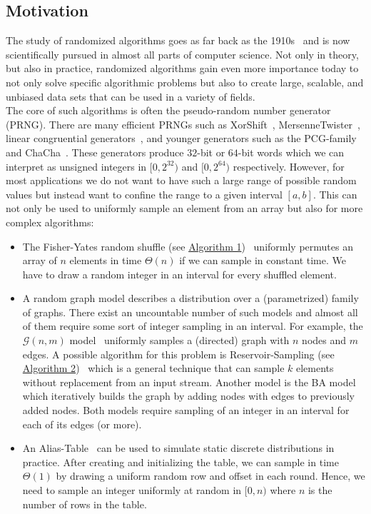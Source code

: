 \documentclass[a4paper, UKenglish, cleveref, autoref, thm-restate]{lipics-v2021}
\begin{document}
\subsection{Motivation}
The study of randomized algorithms goes as far back as the 1910s~\cite{MathComp} and is now scientifically pursued in almost all parts of computer science.
Not only in theory, but also in practice, randomized algorithms gain even more importance today to not only solve specific algorithmic problems but also to create large, scalable, and unbiased data sets that can be used in a variety of fields.
\\
The core of such algorithms is often the pseudo-random number generator (PRNG).
There are many efficient PRNGs such as XorShift~\cite{XS}, MersenneTwister~\cite{MT}, linear congruential generators~\cite{LinConGen, MINSTD, LM}, and younger generators such as the PCG-family~\cite{PCG} and ChaCha~\cite{Cha}.
These generators produce $32$-bit or $64$-bit words which we can interpret as unsigned integers in $[0,2^{32})$ and $[0,2^{64})$ respectively.
However, for most applications we do not want to have such a large range of possible random values but instead want to confine the range to a given interval $[a,b]$.
This can not only be used to uniformly sample an element from an array but also for more complex algorithms:
\begin{itemize}
    \item The Fisher-Yates random shuffle (see \hyperref[alg:fy]{Algorithm 1})~\cite{FY} uniformly permutes an array of $n$ elements in time $\Theta(n)$ if we can sample in constant time. 
    We have to draw a random integer in an interval for every shuffled element.
    \item A random graph model describes a distribution over a (parametrized) family of graphs. 
    There exist an uncountable number of such models and almost all of them require some sort of integer sampling in an interval. 
    For example, the $\mathcal{G}(n,m)$ model~\cite{GNM} uniformly samples a (directed) graph with $n$ nodes and $m$ edges. 
    A possible algorithm for this problem is Reservoir-Sampling (see \hyperref[alg:gnm]{Algorithm 2})~\cite{Reservoir} which is a general technique that can sample $k$ elements without replacement from an input stream. 
    Another model is the BA model~\cite{BABook,BA} which iteratively builds the graph by adding nodes with edges to previously added nodes. %
    Both models require sampling of an integer in an interval for each of its edges (or more).
    \item An Alias-Table~\cite{Alias} can be used to simulate static discrete distributions in practice. 
    After creating and initializing the table, we can sample in time $\Theta(1)$ by drawing a uniform random row and offset in each round. 
    Hence, we need to sample an integer uniformly at random in $[0,n)$ where $n$ is the number of rows in the table.
\end{itemize}
\end{document}
